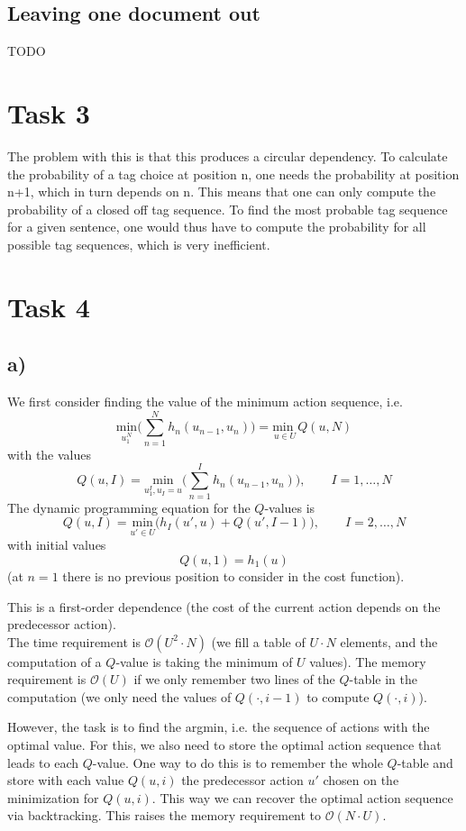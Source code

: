 \documentclass[%
   11pt,              %
   ngerman,           %
   a4paper,           %
   DIV11,             %
]{scrartcl}%
\begin{document}
\subsection*{Leaving one document out}
TODO
\section*{Task 3}
The problem with this is that this produces a circular dependency. To calculate the probability of a tag choice at position n, one needs the probability at position n+1, which in turn depends on n. This means that one can only compute the probability of a closed off tag sequence. To find the most probable tag sequence for a given sentence, one would thus have to compute the probability for all possible tag sequences, which is very inefficient.
\section*{Task 4}
\subsection*{a)}
We first consider finding the value of the minimum action sequence, i.e.
\begin{equation*}
	\underset{u_1^N}{\text{min}} \bigg(\sum_{n=1}^N h_n(u_{n-1},u_n)\bigg) = \underset{u \in U}{\text{min }} Q(u,N)
\end{equation*}
with the values
\begin{equation*}
	Q(u,I) = \underset{u_1^I, u_I = u}{\text{min}}\bigg(\sum_{n=1}^I h_n(u_{n-1},u_n)\bigg), \qquad I = 1,\ldots, N
\end{equation*}
The dynamic programming equation for the $Q$-values is
\begin{equation*}
	Q(u,I) = \underset{u' \in U}{\text{min}}\bigg(h_I(u',u) + Q(u', I-1)\bigg), \qquad I = 2,\ldots,N
\end{equation*}
with initial values
\begin{equation*}
	Q(u,1) = h_1(u)
\end{equation*}
(at $n=1$ there is no previous position to consider in the cost function).\par
This is a first-order dependence (the cost of the current action depends on the predecessor action). \\
The time requirement is $\mathcal{O}(U^2 \cdot N)$ (we fill a table of $U\cdot N$ elements, and the computation of a $Q$-value is taking the minimum of $U$ values). The memory requirement is $\mathcal{O}(U)$ if we only remember two lines of the $Q$-table in the computation (we only need the values of $Q(\cdot, i-1)$ to compute $Q(\cdot, i)$). \par
However, the task is to find the argmin, i.e. the sequence of actions with the optimal value. For this, we also need to store the optimal action sequence that leads to each $Q$-value. One way to do this is to remember the whole $Q$-table and store with each value $Q(u,i)$ the predecessor action $u'$ chosen on the minimization for $Q(u,i)$. This way we can recover the optimal action sequence via backtracking. This raises the memory requirement to $\mathcal{O}(N \cdot U)$.
\end{document}
